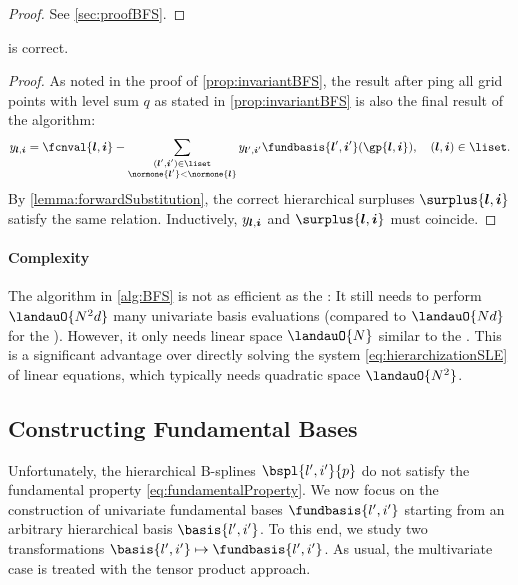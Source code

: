 \begin{proof}
  See \cref{sec:proofBFS}.
\end{proof}

\begin{shortcorollary}
  \label{cor:algBFSCorrectness}
   is correct.
\end{shortcorollary}

\begin{proof}
  As noted in the proof of \cref{prop:invariantBFS},
  the result after \pop{}ping all grid points with level sum
  $q$ as stated in \cref{prop:invariantBFS} is also the final result
  of the algorithm:
  \begin{equation}
    \linout{\*l,\*i}
    = \fcnval{\*l,\*i} -
    \sum_{\substack{(\*l',\*i')\in\liset\\\normone{\*l'} < \normone{\*l}}}
    \linout{\*l',\*i'} \fundbasis{\*l',\*i'}(\gp{\*l,\*i}),\quad
    (\*l, \*i) \in \liset.
  \end{equation}
  By \cref{lemma:forwardSubstitution},
  the correct hierarchical surpluses $\surplus{\*l,\*i}$
  satisfy the same relation.
  Inductively, $\linout{\*l,\*i}$ and $\surplus{\*l,\*i}$ must coincide.
\end{proof}

\paragraph{Complexity}

The \bfs algorithm in \cref{alg:BFS} is not as efficient as the \up:
It still needs to perform $\landauO{N^2 d}$ many univariate
basis evaluations (compared to $\landauO{Nd}$ for the \up).
However, it only needs linear space $\landauO{N}$ similar to the \up.
This is a significant advantage over directly solving the system
\eqref{eq:hierarchizationSLE} of linear equations, which typically
needs quadratic space $\landauO{N^2}$.



\subsection{Constructing Fundamental Bases}
\label{sec:442constructingFundamentalBases}

Unfortunately, the hierarchical B-splines $\bspl{l',i'}{p}$ do not
satisfy the fundamental property \eqref{eq:fundamentalProperty}.
We now focus on the construction of univariate fundamental bases
$\fundbasis{l',i'}$ starting from an
arbitrary hierarchical basis $\basis{l',i'}$.
To this end, we study two transformations
$\basis{l',i'} \mapsto \fundbasis{l',i'}$.
As usual, the multivariate case is treated with the
tensor product approach.

